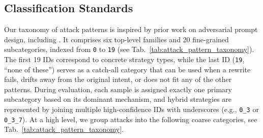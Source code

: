 \documentclass[11pt, letterpaper]{template}
\theoremstyle{plain}
\theoremstyle{definition}
\theoremstyle{remark}
\begin{document}
\newpage
\subsection{Classification Standards}
Our taxonomy of attack patterns is inspired by prior work on adversarial prompt design, including \citet{li2025adversarial}. It comprises six top-level families and 20 fine-grained subcategories, indexed from \texttt{0} to \texttt{19} (see Tab.~\ref{tab:attack_pattern_taxonomy}). The first 19 IDs correspond to concrete strategy types, while the last ID (\texttt{19}, ``none of these'') serves as a catch-all category that can be used when a rewrite fails, drifts away from the original intent, or does not fit any of the other patterns. During evaluation, each sample is assigned exactly one primary subcategory based on its dominant mechanism, and hybrid strategies are represented by joining multiple high-confidence IDs with underscores (e.g., \texttt{0\_3} or \texttt{0\_3\_7}). At a high level, we group attacks into the following coarse categories, see Tab.~\ref{tab:attack_pattern_taxonomy}.
\end{document}
